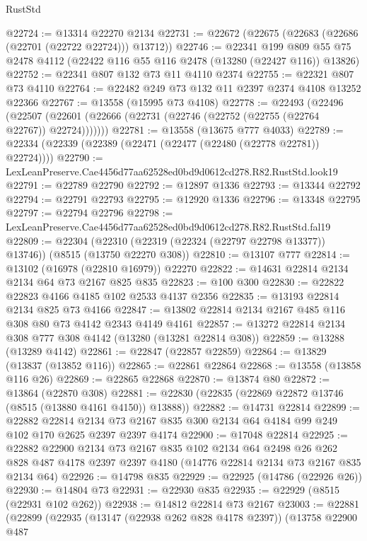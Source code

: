 \begin{lexlean}{RustStd}
\begin{coremodule}
@22724 := @13314 @22270 @2134
@22731 := @22672 (@22675 (@22683 (@22686 (@22701 (@22722 @22724))) @13712))
@22746 := @22341
    @199
    @809
    @55
    @75
    @2478
    @4112
    (@22422 @116 @55 @116 @2478 (@13280 (@22427 @116)) @13826)
@22752 := @22341 @807 @132 @73 @11 @4110 @2374
@22755 := @22321 @807 @73 @4110
@22764 := @22482 @249 @73 @132 @11 @2397 @2374 @4108 @13252 @22366
@22767 := @13558 (@15995 @73 @4108)
@22778 := @22493
    (@22496 (@22507 (@22601 (@22666 (@22731 (@22746 (@22752 (@22755 (@22764 @22767)) @22724)))))))
@22781 := @13558 (@13675 @777 @4033)
@22789 := @22334 (@22339 (@22389 (@22471 (@22477 (@22480 (@22778 @22781)) @22724))))
@22790 := LexLeanPreserve.Cae4456d77aa62528ed0bd9d0612cd278.R82.RustStd.look19
@22791 := @22789 @22790
@22792 := @12897 @1336
@22793 := @13344 @22792
@22794 := @22791 @22793
@22795 := @12920 @1336
@22796 := @13348 @22795
@22797 := @22794 @22796
@22798 := LexLeanPreserve.Cae4456d77aa62528ed0bd9d0612cd278.R82.RustStd.fal19
@22809 := @22304
    (@22310 (@22319 (@22324 (@22797 @22798 @13377)) @13746))
    (@8515 (@13750 @22270 @308))
@22810 := @13107 @777
@22814 := @13102 (@16978 (@22810 @16979)) @22270
@22822 := @14631 @22814 @2134 @2134 @64 @73 @2167 @825 @835
@22823 := @100 @300
@22830 := @22822 @22823 @4166 @4185 @102 @2533 @4137 @2356
@22835 := @13193 @22814 @2134 @825 @73 @4166
@22847 := @13802 @22814 @2134 @2167 @485 @116 @308 @80 @73 @4142 @2343 @4149 @4161
@22857 := @13272 @22814 @2134 @308 @777 @308 @4142 (@13280 (@13281 @22814 @308))
@22859 := @13288 (@13289 @4142)
@22861 := @22847 (@22857 @22859)
@22864 := @13829 (@13837 (@13852 @116))
@22865 := @22861 @22864
@22868 := @13558 (@13858 @116 @26)
@22869 := @22865 @22868
@22870 := @13874 @80
@22872 := @13864 (@22870 @308)
@22881 := @22830 (@22835 (@22869 @22872 @13746 (@8515 (@13880 @4161 @4150)) @13888))
@22882 := @14731 @22814
@22899 := @22882
    @22814
    @2134
    @73
    @2167
    @835
    @300
    @2134
    @64
    @4184
    @99
    @249
    @102
    @170
    @2625
    @2397
    @2397
    @4174
@22900 := @17048 @22814
@22925 := @22882
    @22900
    @2134
    @73
    @2167
    @835
    @102
    @2134
    @64
    @2498
    @26
    @262
    @828
    @487
    @4178
    @2397
    @2397
    @4180
    (@14776 @22814 @2134 @73 @2167 @835 @2134 @64)
@22926 := @14798 @835
@22929 := @22925 (@14786 (@22926 @26))
@22930 := @14804 @73
@22931 := @22930 @835
@22935 := @22929 (@8515 (@22931 @102 @262))
@22938 := @14812 @22814 @73 @2167
@23003 := @22881
    (@22899
      (@22935
        (@13147 (@22938 @262 @828 @4178 @2397))
        (@13758
          @22900
          @487

\end{coremodule}
\end{lexlean}
